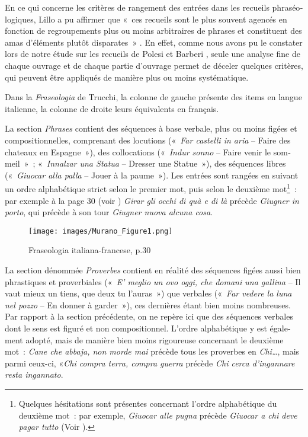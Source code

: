 \documentclass[output=paper,booklanguage=french]{langscibook}
\begin{document}
\begin{otherlanguage}{french}
En ce qui concerne les critères de rangement des entrées dans les recueils phraséologiques, Lillo a pu affirmer que «~ces recueils sont le plus souvent agencés en fonction de regroupements plus ou moins arbitraires de phrases et constituent des amas d’éléments plutôt disparates~» \citep[76]{Lillo1994}. En effet, comme nous avons pu le constater lors de notre étude sur les recueils de Polesi et Barberi \citep{Murano2020}, seule une analyse fine de chaque ouvrage et de chaque partie d’ouvrage permet de déceler quelques critères, qui peuvent être appliqués de manière plus ou moins systématique.

Dans la \emph{Fraseologia} de Trucchi, la colonne de gauche présente des items en langue italienne, la colonne de droite leurs équivalents en français.

La section \emph{Phrases} contient des séquences à base verbale, plus ou moins figées et compositionnelles, comprenant des locutions («~\emph{Far castelli in aria} – Faire des chateaux en Espagne~»), des collocations («~\emph{Indur sonno} – Faire venir le sommeil~»~; «~\emph{Innalzar una Statua} – Dresser une Statue~»), des séquences libres («~\emph{Giuocar alla palla} – Jouer à la paume~»). Les entrées sont rangées en suivant un ordre alphabétique strict selon le premier mot, puis selon le deuxième mot\footnote{Quelques hésitations sont présentes concernant l’ordre alphabétique du deuxième mot~: par exemple, \emph{Giuocar alle pugna} précède \emph{Giuocar a chi deve pagar tutto} (Voir ).}~: par exemple à la page 30 (voir ) \emph{Girar gli occhi di quà e di là} précède \emph{Giugner in porto}, qui précède à son tour \emph{Giugner nuova alcuna cosa}.

\begin{figure}
\texttt{[image: images/Murano\_Figure1.png]}
\caption{Fraseologia italiana-francese, p.30}
\label{fig:murano:Figure 1}
\end{figure}

La section dénommée \emph{Proverbes} contient en réalité des séquences figées aussi bien phrastiques et proverbiales («~\emph{E’ meglio un ovo oggi, che domani una gallina} – Il vaut mieux un tiens, que deux tu l’auras~») que verbales («~\emph{Far vedere la luna nel pozzo} – En donner à garder~»), ces dernières étant bien moins nombreuses. Par rapport à la section précédente, on ne repère ici que des séquences verbales dont le sens est figuré et non compositionnel. L’ordre alphabétique y est également adopté, mais de manière bien moins rigoureuse concernant le deuxième mot~: \emph{Cane che abbaja, non morde mai} précède tous les proverbes en \emph{Chi…}, mais parmi ceux-ci, «\emph{Chi compra terra, compra guerra} précède \emph{Chi cerca d’ingannare resta ingannato}.


\end{otherlanguage}
\end{document}
